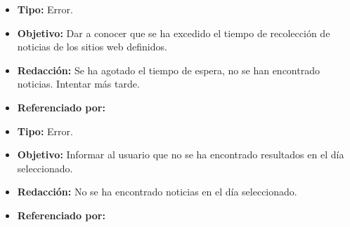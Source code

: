   
    \begin{itemize}
      \item \textbf{Tipo:} Error. 
      \item \textbf{Objetivo:}  Dar a conocer que se ha excedido el tiempo de recolección de noticias de los sitios web definidos.
      \item \textbf{Redacción:} Se ha agotado el tiempo de espera, no se han encontrado noticias. Intentar más tarde.
      \item \textbf{Referenciado por:} \\
    \end{itemize}

  \begin{itemize}
    \item \textbf{Tipo:} Error. 
    \item \textbf{Objetivo:}  Informar al usuario que no se ha encontrado resultados en el día seleccionado.
    \item \textbf{Redacción:}  No se ha encontrado noticias en el día seleccionado.

    \item \textbf{Referenciado por:} \\
  \end{itemize}



